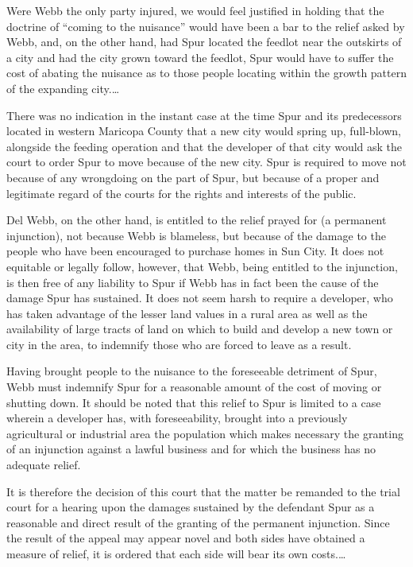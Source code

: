 Were Webb the only party injured, we would feel justified in holding that the
doctrine of ``coming to the nuisance'' would have been a bar to the relief asked
by Webb, and, on the other hand, had Spur located the feedlot near the outskirts
of a city and had the city grown toward the feedlot, Spur would have to suffer
the cost of abating the nuisance as to those people locating within the growth
pattern of the expanding city.\ldots

There was no indication in the instant case at the time Spur and its
predecessors located in western Maricopa County that a new city would spring up,
full-blown, alongside the feeding operation and that the developer of that city
would ask the court to order Spur to move because of the new city. Spur is
required to move not because of any wrongdoing on the part of Spur, but because
of a proper and legitimate regard of the courts for the rights and interests of
the public.

Del Webb, on the other hand, is entitled to the relief prayed for (a permanent
injunction), not because Webb is blameless, but because of the damage to the
people who have been encouraged to purchase homes in Sun City. It does not
equitable or legally follow, however, that Webb, being entitled to the
injunction, is then free of any liability to Spur if Webb has in fact been the
cause of the damage Spur has sustained. It does not seem harsh to require a
developer, who has taken advantage of the lesser land values in a rural area as
well as the availability of large tracts of land on which to build and develop a
new town or city in the area, to indemnify those who are forced to leave as a
result.

Having brought people to the nuisance to the foreseeable detriment of Spur, Webb
must indemnify Spur for a reasonable amount of the cost of moving or shutting
down. It should be noted that this relief to Spur is limited to a case wherein a
developer has, with foreseeability, brought into a previously agricultural or
industrial area the population which makes necessary the granting of an
injunction against a lawful business and for which the business has no adequate
relief.

It is therefore the decision of this court that the matter be remanded to the
trial court for a hearing upon the damages sustained by the defendant Spur as a
reasonable and direct result of the granting of the permanent injunction. Since
the result of the appeal may appear novel and both sides have obtained a measure
of relief, it is ordered that each side will bear its own costs.\ldots


